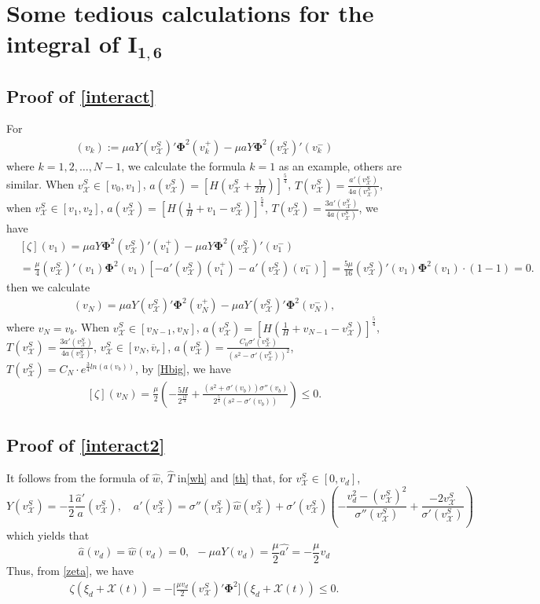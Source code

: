 \documentclass[12pt,reqno]{amsart}
\numberwithin{equation}{section}
\def\th{\hat{T}}
\def\wh{\hat{w}}
\def\ph{\mathbf{\Phi}}
\def\vsx{v^S_{\mathcal{X}}}
\def\avr{\overline{v}_r}
\def\X{\mathcal{X}}
\begin{document}
\section{Some tedious calculations for the integral of $\mathbf{I_{1,6}}$}
\subsection{Proof of \eqref{interact}}

For 
\begin{align*}
	[\zeta](v_k):=\mu aY(\vsx)' \ph^2(v_k^+)-\mu aY\ph^2(\vsx)' (v_k^-)
\end{align*}
where $k=1,2,\dots, N-1$, we calculate 
the formula $k=1$ as an example, others are similar. When $\vsx \in [v_0,v_1]$, $a(\vsx)=[H(\vsx+\frac{1}{2H})]^{\frac{5}{4}}$, $T(\vsx)=\frac{a'(\vsx)}{4a(\vsx)}$, when $\vsx \in [v_1,v_2]$, $a(\vsx)=[H(\frac{1}{H}+v_1-\vsx)]^{\frac{5}{4}}$, 
$T(\vsx)=\frac{3a'(\vsx)}{4a(\vsx)}$, we have
\begin{equation}\label{apd1}
	\begin{aligned}
		&[\zeta](v_1)=\mu aY\ph^2(\vsx)'(v_1^+)-\mu aY\ph^2(\vsx)'(v_1^-)\\
		&=\frac{\mu}{4}(\vsx)'(v_1)\ph^2(v_1)[-a'(\vsx)(v_1^+)-a'(\vsx)(v_1^-)]=\frac{5\mu}{16} (\vsx)'(v_1)\ph^2(v_1)\cdot (1-1)=0.
	\end{aligned}
\end{equation}
then we calculate 
\begin{align*}
	[\zeta](v_N)=\mu aY(\vsx)'\ph^2(v_N^+)-\mu aY(\vsx)'\ph^2(v_N^-),
\end{align*}
where $v_N=v_b$. When $\vsx \in [v_{N-1},v_N]$, $a(\vsx)=[H(\frac{1}{H}+v_{N-1}-\vsx)]^{\frac{5}{4}}$, $T(\vsx)=\frac{3a'(\vsx)}{4a(\vsx)}$, $\vsx \in [v_N,\avr]$, $a(\vsx)=\frac{C_0\sigma'(\vsx)}{(s^2-\sigma'(\vsx))^2}$, $T(\vsx)=C_N \cdot e^{\frac{3}{4}ln(a(v_b))}$,
by \eqref{Hbig}, we have 
\begin{equation}\label{apd2}
	\begin{aligned}
		[\zeta](v_N)=\frac{\mu}{2}\left(-\frac{5H}{2^{\frac{13}{4}}}+\frac{(s^2+\sigma'(v_b))\sigma''(v_b)}{2^{\frac{5}{4}}(s^2-\sigma'(v_b))}\right)\leq 0.
	\end{aligned}
\end{equation}

\subsection{Proof of \eqref{interact2}}
It follows from the formula of $\wh,~\th$ in\eqref{wh} and \eqref{th} that, for $\vsx\in[0,v_d]$, 
$$Y(\vsx)=-\frac{1}{2}\frac{\hat{a}'}{a}(\vsx),\quad a'(\vsx)=\sigma''(\vsx)\wh(\vsx)+\sigma'(\vsx)\left(-\frac{v_d^2-(\vsx)^2}{\sigma''(\vsx)}+\frac{-2\vsx}{\sigma'(\vsx)}\right)$$ which yields that
$$\hat{a}(v_d)=\wh(v_d)=0, ~~-\mu aY(v_d)=\frac{\mu}{2}\hat{a'}=-\frac{\mu}{2}v_d$$ 
Thus, from \eqref{zeta},  we have
\begin{align*}
	\zeta(\xi_d+\X(t))=-\big[\frac{\mu v_d}{2}(\vsx)'\ph^2\big](\xi_d+\X(t))\leq 0.
\end{align*}
\end{document}
